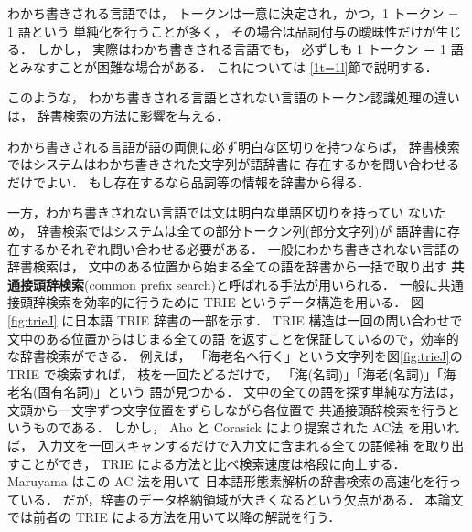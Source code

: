 わかち書きされる言語では，
トークンは一意に決定され，かつ，1 トークン = 1 語という
単純化を行うことが多く，
その場合は品詞付与の曖昧性だけが生じる．
しかし，
実際はわかち書きされる言語でも，
必ずしも 1 トークン ＝ 1 語とみなすことが困難な場合がある．
これについては \ref{1t=1l}節で説明する．

このような，
わかち書きされる言語とされない言語のトークン認識処理の違いは，
辞書検索の方法に影響を与える．

わかち書きされる言語が語の両側に必ず明白な区切りを持つならば，
辞書検索ではシステムはわかち書きされた文字列が語辞書に
存在するかを問い合わせるだけでよい．
もし存在するなら品詞等の情報を辞書から得る．

一方，わかち書きされない言語では文は明白な単語区切りを持ってい
ないため，
辞書検索ではシステムは全ての部分トークン列(部分文字列)が
語辞書に存在するかそれぞれ問い合わせる必要がある．
一般にわかち書きされない言語の辞書検索は，
文中のある位置から始まる全ての語を辞書から一括で取り出す
{\bf 共通接頭辞検索}(common prefix search)と呼ばれる手法が用いられる．
一般に共通接頭辞検索を効率的に行うために
TRIE というデータ構造を用いる．
図\ref{fig:trieJ} に日本語 TRIE 辞書の一部を示す．
TRIE 構造は一回の問い合わせで文中のある位置からはじまる全ての語 
を返すことを保証しているので，効率的な辞書検索ができる．
例えば，
「海老名へ行く」という文字列を図\ref{fig:trieJ}の TRIE で検索すれば，
枝を一回たどるだけで，
「海(名詞)」「海老(名詞)」「海老名(固有名詞)」という
語が見つかる．
文中の全ての語を探す単純な方法は，
文頭から一文字ずつ文字位置をずらしながら各位置で
共通接頭辞検索を行うというものである．
しかし，
Aho と Corasick により提案された AC法\cite{Aho93} を用いれば，
入力文を一回スキャンするだけで入力文に含まれる全ての語候補
を取り出すことができ，
TRIE による方法と比べ検索速度は格段に向上する．
Maruyama\cite{Maruyama94} はこの AC 法を用いて
日本語形態素解析の辞書検索の高速化を行っている．
だが，辞書のデータ格納領域が大きくなるという欠点がある．
本論文では前者の TRIE による方法を用いて以降の解説を行う．



